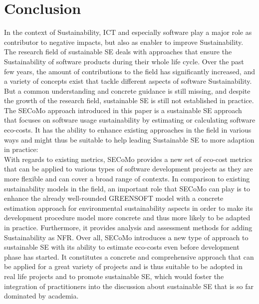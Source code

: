\documentclass[oribibl]{llncs}
\begin{document}
\section{Conclusion}
In the context of Sustainability, ICT and especially software play a major role as contributor to negative impacts, but also as enabler to improve Sustainability. The research field of sustainable SE deals with approaches that ensure the Sustainability of software products during their whole life cycle. Over the past few years, the amount of contributions to the field has significantly increased, and a variety of concepts exist that tackle different aspects of software Sustainability. But a common understanding and concrete guidance is still missing, and despite the growth of the research field, sustainable SE is still not established in practice.\\
The SECoMo approach introduced in this paper is a sustainable SE approach that focuses on software usage sustainability by estimating or calculating software eco-costs. It has the ability to enhance existing approaches in the field in various ways and might thus be suitable to help leading Sustainable SE to more adaption in practice:\\
With regards to existing metrics, SECoMo provides a new set of eco-cost metrics that can be applied to various types of software development projects as they are more flexible and can cover a broad range of contexts. In comparison to existing sustainability models in the field, an important role that SECoMo can play is to enhance the already well-rounded GREENSOFT model with a concrete estimation approach for environmental sustainability aspects in order to make its development procedure model more concrete and thus more likely to be adapted in practice. Furthermore, it provides analysis and assessment methods for adding Sustainability as NFR. Over all, SECoMo introduces a new type of approach to sustainable SE with its ability to estimate eco-costs even before development phase has started. It constitutes a concrete and comprehensive approach that can be applied for a great variety of projects and is thus suitable to be adopted in real life projects and to promote sustainable SE, which would foster the integration of practitioners into the discussion about sustainable SE that is so far dominated by academia.\\ %
\end{document}
